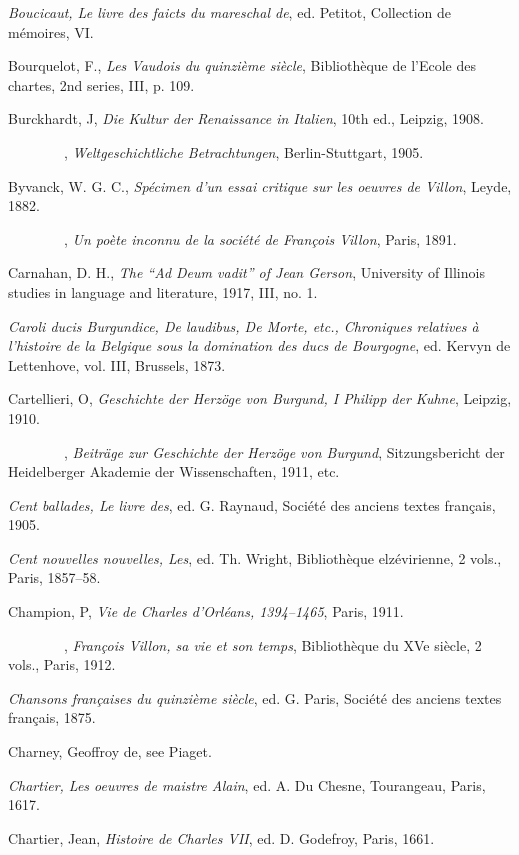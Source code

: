 \emph{Boucicaut, Le livre des faicts du mareschal de}, ed. Petitot,
Collection de mémoires, VI.

Bourquelot, F., \emph{Les Vaudois du quinzième siècle}, Bibliothèque de
l'Ecole des chartes, 2nd series, III, p. 109.

Burckhardt, J, \emph{Die Kultur der Renaissance in Italien}, 10th ed.,
Leipzig, 1908.

{~~~~~~~~}, \emph{Weltgeschichtliche Betrachtungen}, Berlin-Stuttgart,
1905.

Byvanck, W. G. C., \emph{Spécimen d'un essai critique sur les oeuvres de
Villon}, Leyde, 1882.

\protect\hypertarget{24_BIBLIOGRAPHY.xhtmlux5cux23page_442}{}{}{~~~~~~~~},
\emph{Un poète inconnu de la société de François Villon}, Paris, 1891.

Carnahan, D. H., \emph{The ``Ad Deum vadit'' of Jean Gerson}, University
of Illinois studies in language and literature, 1917, III, no. 1.

\emph{Caroli ducis Burgundice, De laudibus, De Morte, etc., Chroniques
relatives à l'histoire de la Belgique sous la domination des ducs de
Bourgogne}, ed. Kervyn de Lettenhove, vol. III, Brussels, 1873.

Cartellieri, O, \emph{Geschichte der Herzöge von Burgund, I Philipp der
Kuhne}, Leipzig, 1910.

{~~~~~~~~}, \emph{Beiträge zur Geschichte der Herzöge von Burgund},
Sitzungsbericht der Heidelberger Akademie der Wissenschaften, 1911, etc.

\emph{Cent ballades, Le livre des}, ed. G. Raynaud, Société des anciens
textes français, 1905.

\emph{Cent nouvelles nouvelles, Les}, ed. Th. Wright, Bibliothèque
elzévirienne, 2 vols., Paris, 1857--58.

Champion, P, \emph{Vie de Charles d'Orléans, 1394--1465}, Paris, 1911.

{~~~~~~~~}, \emph{François Villon, sa vie et son temps}, Bibliothèque du
XVe siècle, 2 vols., Paris, 1912.

\emph{Chansons françaises du quinzième siècle}, ed. G. Paris, Société
des anciens textes français, 1875.

Charney, Geoffroy de, see Piaget.

\emph{Chartier, Les oeuvres de maistre Alain}, ed. A. Du Chesne,
Tourangeau, Paris, 1617.

Chartier, Jean, \emph{Histoire de Charles VII}, ed. D. Godefroy, Paris,
1661.

